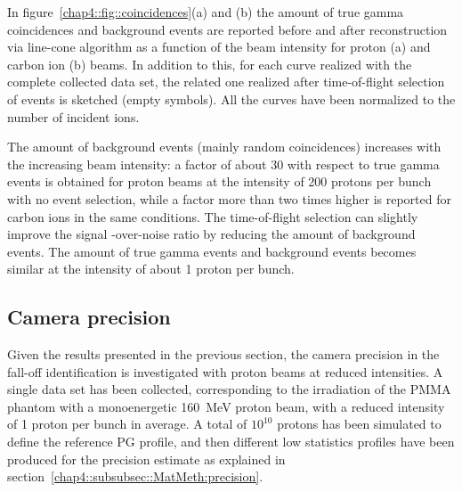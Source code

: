 In figure~\ref{chap4::fig::coincidences}(a) and (b) the amount of true gamma coincidences and background events are reported before and after reconstruction via line-cone algorithm as a function of the beam intensity for proton (a) and carbon ion (b) beams. In addition to this, for each curve realized with the complete collected data set, the related one realized after time-of-flight selection of events is sketched (empty symbols). All the curves have been normalized to the number of incident ions.

The amount of background events (mainly random coincidences) increases with the increasing beam intensity: a factor of about 30 with respect to true gamma events is obtained for proton beams at  the intensity of 200 protons per bunch with no event selection, while a factor more than two times higher is reported for carbon ions in the same conditions. The time-of-flight selection can slightly improve the signal -over-noise ratio by reducing the amount of background events. The amount of true gamma events and background events becomes similar at the intensity of about 1 proton per bunch.


\subsection{Camera precision}\label{chap4::subsec::Results::precision_reconstruction}
Given the results presented in the previous section, the camera precision in the fall-off identification is investigated with proton beams at reduced intensities.
A single data set has been collected, corresponding to the irradiation of the PMMA phantom with a monoenergetic 160~MeV  proton beam, with a reduced intensity of 1 proton per bunch in average. A total of $10^{10}$ protons has been simulated to define the reference PG profile, and then different low statistics profiles have been produced for the precision estimate as explained in section~\ref{chap4::subsubsec::MatMeth:precision}. 

